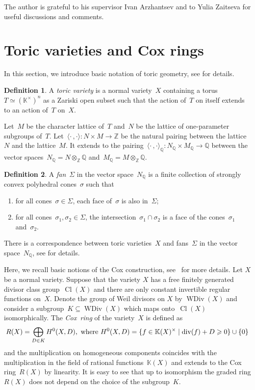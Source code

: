 \documentclass[a4paper,reqno,12pt]{amsart}
\DeclareMathOperator {\Cl}{Cl}
\DeclareMathOperator {\divisor}{div}
\DeclareMathOperator {\WDiv}{WDiv}
\def\Z  {\mathbb Z}
\def\Q  {\mathbb Q}
\def\K  {\mathbb K}
\theoremstyle{definition}
\newtheorem{defn}{Definition}
\begin{document}
The author is grateful to his supervisor Ivan Arzhantsev and to Yulia Zaitseva for useful discussions and comments.


\section{Toric varieties and Cox rings}\label{coxring}
In this section, we introduce basic notation of toric geometry,
see \cite{Fu, CLS} for details.

\begin{defn}
  A \emph{toric variety} is a normal variety~$X$ containing a torus~$T\simeq (\K^{\times})^n$ as a Zariski open subset such that the action of~$T$ on itself extends to an action of~$T$ on~$X$.
\end{defn}


Let~$M$ be the character lattice of~$T$ and~$N$ be the lattice of one-parameter subgroups of~$T$. Let~$\langle \cdot\,, \cdot\rangle: N \times M \to \Z$ be the natural pairing between the lattice~$N$ and the lattice~$M$.
It extends to the pairing~$\langle \cdot\,, \cdot\rangle_{\Q}: N_{\Q} \times M_{\Q} \to \Q$  between the vector spaces~${N_{\Q}=N\otimes_{\Z} \Q}$ and~${M_{\Q}=M\otimes_{\Z} \Q}$.
\begin{defn}
  A \emph{fan}~$\Sigma$ in the vector space~$N_{\Q}$ is a finite collection of strongly convex polyhedral cones~$\sigma$ such that
  \begin{enumerate}
  \item for all cones~$\sigma \in \Sigma$, each face of~$\sigma$ is also in~$\Sigma$;
  \item for all cones~$\sigma_1, \sigma_2 \in \Sigma$, the intersection~$\sigma_1 \cap \sigma_2$ is a face of the cones~$\sigma_1$ and~$\sigma_2$.
  \end{enumerate}
\end{defn}

There is a correspondence between toric varieties~$X$ and fans~$\Sigma$ in the vector space~$N_{\Q}$,
see \cite[Section~3.1]{CLS} for details. 

\smallskip

Here, we recall basic notions of the Cox construction, see~\cite[Chapter~1]{ADHL} for more details.
Let $X$ be a normal variety.
Suppose that the variety $X$ has a free finitely generated divisor class group~$\Cl(X)$ and there are only constant invertible regular functions on~$X$.
Denote the group of Weil divisors on $X$ by $\WDiv(X)$ and consider a subgroup~${K \subseteq \WDiv(X)}$ which maps onto~$\Cl(X)$ isomorphically. The \emph{Cox~ring} of the variety~$X$ is defined as
\[R(X)=\bigoplus_{D\in K} H^0(X,D) \text{, \,where }H^0(X,D)=\{f\in\K(X)^{\times}\mid \divisor(f)+D\geqslant0\}\cup\{0\}\]
and the multiplication on homogeneous components coincides with the multiplication in the field of rational functions~$\K(X)$ and extends to the Cox ring~$R(X)$ by linearity.
It is easy to see that up to isomorphism the graded ring $R(X)$ does not depend on the choice of the subgroup~$K$.
\end{document}
